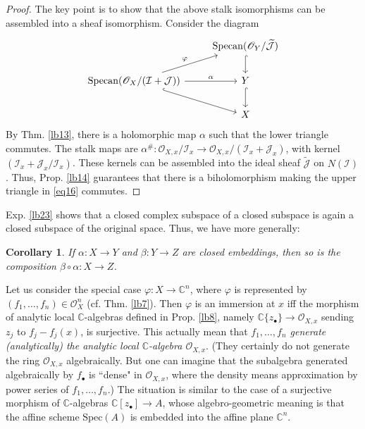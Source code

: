 \documentclass[12pt,b5paper,notitlepage]{report}
\theoremstyle{definition}
\theoremstyle{plain}
\newtheorem{co}[df]{Corollary}
\newcommand{\mc}{\mathcal}
\newcommand{\wtd}{\widetilde}
\newcommand{\scr}{\mathscr}
\newcommand{\blt}{\bullet}
\newcommand{\Cbb}{\mathbb C}
\newcommand{\Specan}{\mathrm{Specan}}
\numberwithin{equation}{section}
\begin{document}
\begin{proof}
The key point is to show that the above stalk isomorphisms can be assembled into a sheaf isomorphism. Consider the diagram
\begin{equation}\label{eq16}
\begin{tikzcd}
                                             & \Specan(\scr O_Y/\wtd{\mc J}) \arrow[d, hook] \\
\Specan(\scr O_X/(\mc I+\mc J)) \arrow[r, "\alpha"] \arrow[rd,hook ] \arrow[ru,"\varphi"] & Y \arrow[d, hook] \\
                                             & X                
\end{tikzcd}
\end{equation}
By Thm. \ref{lb13}, there is a holomorphic map $\alpha$ such that the lower triangle commutes. The stalk maps are $\alpha^\#:\scr O_{X,x}/\mc I_x\rightarrow\scr O_{X,x}/(\mc I_x+\mc J_x)$, with kernel $(\mc I_x+\mc J_x/\mc I_x)$. These kernels can be assembled into the ideal sheaf $\wtd{\mc J}$ on $N(\mc I)$. Thus, Prop. \ref{lb14} guarantees that there is a biholomorphism making the upper triangle in \eqref{eq16} commutes.
\end{proof}



Exp. \ref{lb23} shows that a closed complex subspace of a closed subspace is again a closed subspace of the original space. Thus, we have more generally:
\begin{co}\label{lb81}
If $\alpha:X\rightarrow Y$ and $\beta:Y\rightarrow Z$ are closed embeddings, then so is the composition $\beta\circ\alpha:X\rightarrow Z$.
\end{co}











Let us consider the special case $\varphi:X\rightarrow\Cbb^n$, where $\varphi$ is represented by $(f_1,\dots,f_n)\in\scr O_X^n$ (cf. Thm. \ref{lb7}). Then $\varphi$ is an immersion at $x$ iff the morphism of analytic local $\Cbb$-algebras  defined in Prop. \ref{lb8}, namely $\Cbb\{z_\blt\}\rightarrow\scr O_{X,x}$ sending $z_j$ to $f_j-f_j(x)$, is surjective. This actually mean that \emph{$f_1,\dots,f_n$ generate (analytically) the analytic local $\Cbb$-algebra $\scr O_{X,x}$}. (They certainly do not generate the ring $\scr O_{X,x}$ algebraically. But one can imagine that the subalgebra generated algebraically by $f_\blt$ is ``dense" in $\scr O_{X,x}$, where the density means approximation by power series of $f_1,\dots,f_n$.) The situation is similar to the case of a surjective morphism of $\Cbb$-algebras $\Cbb[z_\blt]\rightarrow A$, whose algebro-geometric meaning is that the affine scheme $\mathrm{Spec}(A)$ is embedded into the affine plane $\Cbb^n$.
\end{document}
